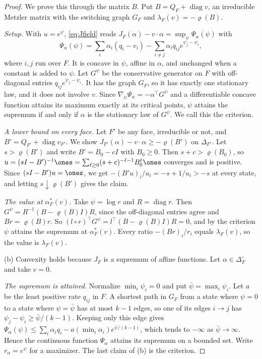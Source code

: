 \begin{proof}
We prove this through the matrix $B$. Put $B=Q_F+\operatorname{diag}v$, an irreducible Metzler matrix with the switching
graph $G_F$ and $\lambda_F(v)=-\varrho(B)$.

\emph{Setup.} With $u=e^\psi$, \eqref{eq:Jfield} reads
$J_F(\alpha)-v\cdot\alpha=\sup_\psi\Psi_\alpha(\psi)$ with
\[
\Psi_\alpha(\psi)=\sum_i\alpha_i(q_i-v_i)-\sum_{i\ne j}\alpha_iq_{ij}e^{\psi_j-\psi_i},
\]
where $i,j$ run over $F$. It is concave in $\psi$, affine in $\alpha$, and
unchanged when a constant is added to $\psi$. Let $G^\psi$ be the conservative
generator on $F$ with off-diagonal entries $q_{ij}e^{\psi_j-\psi_i}$. It has the
graph $G_F$, so it has exactly one stationary law, and it does not involve $v$.
Since $\nabla_\psi\Psi_\alpha=-\alpha^\top G^\psi$ and a differentiable concave
function attains its maximum exactly at its critical points, $\psi$ attains the
supremum if and only if $\alpha$ is the stationary law of $G^\psi$. We call this
the criterion.

\emph{A lower bound on every face.} Let $F'$ be any face, irreducible or not, and
$B'=Q_{F'}+\operatorname{diag}v_{F'}$. We show
$J_{F'}(\alpha)-v\cdot\alpha\ge-\varrho(B')$ on $\Delta_{F'}$. Let
$s>\varrho(B')$ and write $B'=B_0-cI$ with $B_0\ge0$. Then $s+c>\varrho(B_0)$, so
$u=(sI-B')^{-1}\ones=\sum_{\ell\ge0}(s+c)^{-\ell-1}B_0^\ell\ones$ converges and is
positive. Since $(sI-B')u=\ones$, we get $-(B'u)_i/u_i=-s+1/u_i>-s$ at every
state, and letting $s\downarrow\varrho(B')$ gives the claim.

\emph{The value at $\alpha^*_F(v)$.} Take $\psi=\log r$ and $R=\operatorname{diag}r$.
Then $G^\psi=R^{-1}(B-\varrho(B)I)R$, since the off-diagonal entries agree and
$Br=\varrho(B)r$. So $(l\circ r)^\top G^\psi=l^\top(B-\varrho(B)I)R=0$, and by the
criterion $\psi$ attains the supremum at $\alpha^*_F(v)$. Every ratio
$-(Br)_i/r_i$ equals $\lambda_F(v)$, so the value is $\lambda_F(v)$.

(b) Convexity holds because $J_F$ is a supremum of affine functions. Let
$\alpha\in\Delta_F^\circ$ and take $v=0$.

\emph{The supremum is attained.} Normalize $\min_i\psi_i=0$ and put
$\bar\psi=\max_i\psi_i$. Let $a$ be the least positive rate $q_{ij}$ in $F$. A
shortest path in $G_F$ from a state where $\psi=0$ to a state where
$\psi=\bar\psi$ has at most $k-1$ edges, so one of its edges $i\to j$ has
$\psi_j-\psi_i\ge\bar\psi/(k-1)$. Keeping only this edge gives
$\Psi_\alpha(\psi)\le\sum_i\alpha_iq_i-a(\min_i\alpha_i)e^{\bar\psi/(k-1)}$, which
tends to $-\infty$ as $\bar\psi\to\infty$. Hence the continuous function
$\Psi_\alpha$ attains its supremum on a bounded set. Write $r_\alpha=e^\psi$ for a
maximizer. The last claim of (b) is the criterion.


\end{proof}
